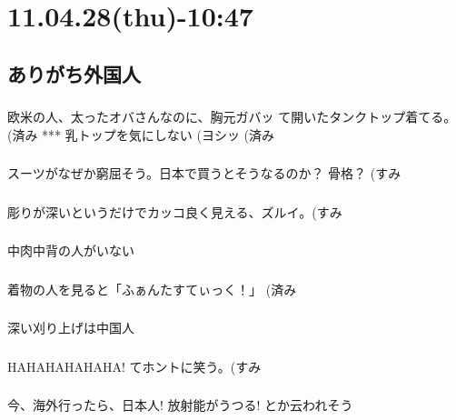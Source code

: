\documentclass[11pt]{article}
\begin{document}
\section{11.04.28(thu)-10:47}
\label{sec-128}
\subsection{ありがち外国人}
\label{sec-128_1}
\subsubsection{}

欧米の人、太ったオバさんなのに、胸元ガバッ て開いたタンクトップ着てる。 (済み
***
乳トップを気にしない (ヨシッ  (済み
\subsubsection{}

スーツがなぜか窮屈そう。日本で買うとそうなるのか？ 骨格？ (すみ
\subsubsection{}

彫りが深いというだけでカッコ良く見える、ズルイ。(すみ
\subsubsection{}

中肉中背の人がいない
\subsubsection{}

着物の人を見ると「ふぁんたすてぃっく！」 (済み
\subsubsection{}

深い刈り上げは中国人
\subsubsection{}

HAHAHAHAHAHA! てホントに笑う。(すみ
\subsubsection{}

今、海外行ったら、日本人! 放射能がうつる! とか云われそう
\subsubsection{}
\end{document}
